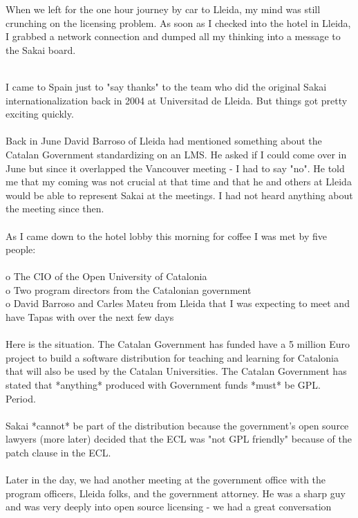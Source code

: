 \documentclass[12pt]{book}
\begin{document}
When we left for the one
hour journey by car to Lleida, my mind
was still crunching on the licensing problem.
As soon as I checked into the hotel in Lleida,
I grabbed a network connection and dumped
all my thinking into a message to the Sakai board.\\
\\
\begin{sf}
I came to Spain just to "say thanks" to the team who
did the original Sakai internationalization back in
2004 at Universitad de Lleida.  But things got
pretty exciting quickly.\\
\\
Back in June David Barroso of Lleida had mentioned
something about the Catalan Government standardizing
on an LMS.  He asked if I could come over in June
but since it overlapped the Vancouver
meeting - I had to say "no".  He told me that my
coming was not crucial at that time and that he
and others at Lleida would be able to represent
Sakai at the meetings.   I had not heard anything
about the meeting since then.\\
\\
As I came down to the hotel lobby this morning for
coffee I was met by five people:\\
\\
o The CIO of the Open University of Catalonia \\
o Two program directors from the Catalonian government \\
o David Barroso and Carles Mateu from Lleida that
I was expecting to meet and have Tapas with over the next
few days\\
\\
Here is the situation.  The Catalan Government has
funded have a 5 million Euro project to build a
software distribution for teaching and learning for
Catalonia that will also be used by the Catalan
Universities.  The Catalan Government has stated that
*anything* produced with Government funds *must* be
GPL.  Period.\\
\\
Sakai *cannot* be part of the distribution because
the government's open source lawyers (more later) decided
that the ECL was "not GPL friendly" because of the
patch clause in the ECL.\\
\\
Later in the day, we had another meeting at the government
office with the program officers, Lleida folks, and the
government attorney.  He was a sharp guy and was very
deeply into open source licensing - we had a great conversation \\

\end{sf}
\end{document}

